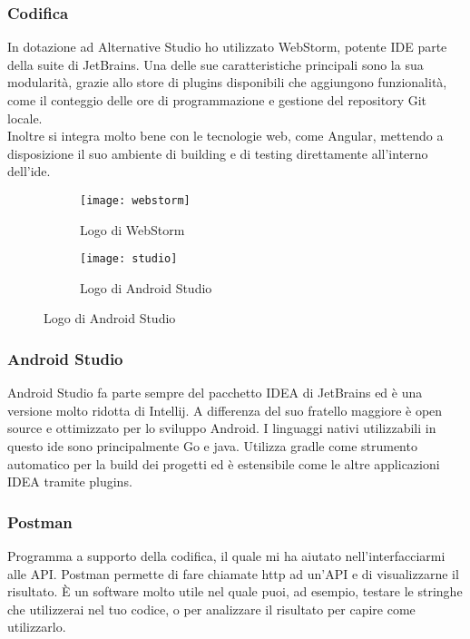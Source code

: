 \subsubsection{Codifica}
In dotazione ad Alternative Studio ho utilizzato WebStorm, potente IDE parte della suite di JetBrains. Una delle sue caratteristiche
principali sono la sua modularità, grazie allo store di plugins disponibili che aggiungono funzionalità, come il conteggio delle ore di
programmazione e gestione del repository \gls{Git} locale. \\
Inoltre si integra molto bene con le tecnologie web, come Angular, mettendo a disposizione il suo ambiente di building e di testing direttamente all'interno dell'\acrshort{ide}.

\begin{figure}[htbp]
	\begin{subfigure}{0.5\textwidth}
		\texttt{[image: webstorm]}
		\caption{Logo di WebStorm}
	\end{subfigure}
	\begin{subfigure}{0.5\textwidth}
		\texttt{[image: studio]}
		\caption{Logo di Android Studio}
	\end{subfigure}
\end{figure}

\subsubsection{Android Studio}
Android Studio fa parte sempre del pacchetto IDEA di JetBrains ed è una versione molto ridotta di Intellij. A differenza del suo
fratello maggiore è open source e ottimizzato per lo sviluppo Android. I linguaggi nativi utilizzabili in questo \acrshort{ide} sono principalmente
\gls{Go} e \gls{java}. Utilizza gradle come strumento automatico per la build dei progetti ed è estensibile come le altre applicazioni IDEA
tramite plugins.

\subsubsection{Postman}
Programma a supporto della codifica, il quale mi ha aiutato nell'interfacciarmi alle API. Postman permette di fare chiamate \acrshort{http} ad
un'API e di visualizzarne il risultato. È un software molto utile nel quale puoi, ad esempio, testare le stringhe che utilizzerai nel tuo
codice, o per analizzare il risultato per capire come utilizzarlo.



